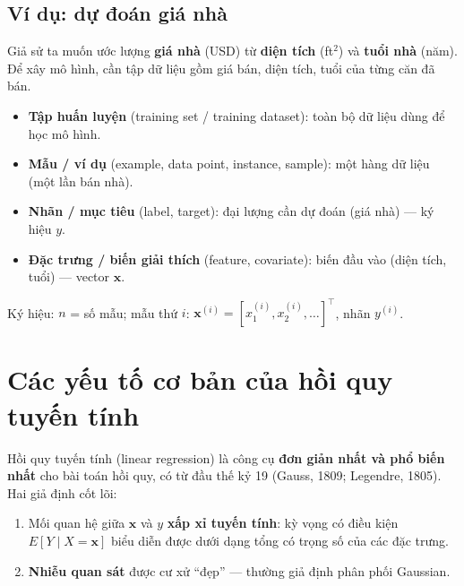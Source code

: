 \documentclass[12pt,a4paper]{article}
\begin{document}
\subsection{Ví dụ: dự đoán giá nhà}

Giả sử ta muốn ước lượng \textbf{giá nhà} (USD) từ \textbf{diện tích} (ft$^2$) và \textbf{tuổi nhà} (năm). Để xây mô hình, cần tập dữ liệu gồm giá bán, diện tích, tuổi của từng căn đã bán.

\begin{dinhnghia}[title={Thuật ngữ học máy trong hồi quy}]
\begin{itemize}
  \item \textbf{Tập huấn luyện} (training set / training dataset): toàn bộ dữ liệu dùng để học mô hình.
  \item \textbf{Mẫu / ví dụ} (example, data point, instance, sample): một hàng dữ liệu (một lần bán nhà).
  \item \textbf{Nhãn / mục tiêu} (label, target): đại lượng cần dự đoán (giá nhà) --- ký hiệu $y$.
  \item \textbf{Đặc trưng / biến giải thích} (feature, covariate): biến đầu vào (diện tích, tuổi) --- vector $\mathbf{x}$.
\end{itemize}
Ký hiệu: $n$ = số mẫu; mẫu thứ $i$: $\mathbf{x}^{(i)} = [x_1^{(i)}, x_2^{(i)}, \ldots]^\top$, nhãn $y^{(i)}$.
\end{dinhnghia}

\newpage

\section{Các yếu tố cơ bản của hồi quy tuyến tính}

\begin{ynghia}[title={Hồi quy tuyến tính là gì?}]
Hồi quy tuyến tính (linear regression) là công cụ \textbf{đơn giản nhất và phổ biến nhất} cho bài toán hồi quy, có từ đầu thế kỷ 19 (Gauss, 1809; Legendre, 1805). Hai giả định cốt lõi:
\begin{enumerate}
  \item Mối quan hệ giữa $\mathbf{x}$ và $y$ \textbf{xấp xỉ tuyến tính}: kỳ vọng có điều kiện $E[Y \mid X=\mathbf{x}]$ biểu diễn được dưới dạng tổng có trọng số của các đặc trưng.
  \item \textbf{Nhiễu quan sát} được cư xử ``đẹp'' --- thường giả định phân phối Gaussian.
\end{enumerate}
\end{ynghia}
\end{document}
